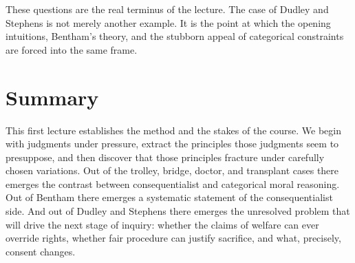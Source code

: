 These questions are the real terminus of the lecture. The case of Dudley and Stephens is not merely another example. It is the point at which the opening intuitions, Bentham's theory, and the stubborn appeal of categorical constraints are forced into the same frame.

\section{Summary}

This first lecture establishes the method and the stakes of the course. We begin with judgments under pressure, extract the principles those judgments seem to presuppose, and then discover that those principles fracture under carefully chosen variations. Out of the trolley, bridge, doctor, and transplant cases there emerges the contrast between consequentialist and categorical moral reasoning. Out of Bentham there emerges a systematic statement of the consequentialist side. And out of Dudley and Stephens there emerges the unresolved problem that will drive the next stage of inquiry: whether the claims of welfare can ever override rights, whether fair procedure can justify sacrifice, and what, precisely, consent changes.